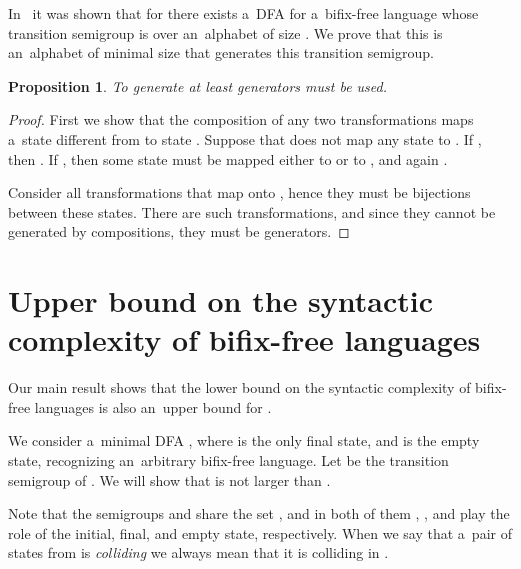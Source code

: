 \documentclass{amsart}
\newtheorem{proposition}[theorem]{Proposition}
\begin{document}
In~\cite{BLY12} it was shown that for  there exists a~DFA for a~bifix-free language
whose transition semigroup is  over an~alphabet of size .
We prove that this is an~alphabet of minimal size that generates this transition semigroup.
\begin{proposition}\label{pro:Vbf_alphabet_lower_bound}
To generate  at least  generators must be used.
\end{proposition}
\begin{proof}
First we show that the composition of any two transformations  maps a~state different from  to state .
Suppose that  does not map any state to .
If , then .
If , then some state  must be mapped either to  or to , and again .

Consider all transformations  that map  onto , hence they must be bijections between these states.
There are  such transformations, and since they cannot be generated by compositions, they must be generators.
\end{proof}

\section{Upper bound on the syntactic complexity of bifix-free languages}

Our main result shows that the lower bound  on the syntactic complexity of bifix-free languages is also an~upper bound for .

We consider a~minimal DFA , where  is the only final state, and  is the empty state, recognizing an~arbitrary bifix-free language.
Let  be the transition semigroup of .
We will show that  is not larger than .

Note that the semigroups  and  share the set , and in both of them , , and  play the role of the initial, final, and empty state, respectively.
When we say that a~pair of states from  is \emph{colliding} we always mean that it is colliding in .
\end{document}
